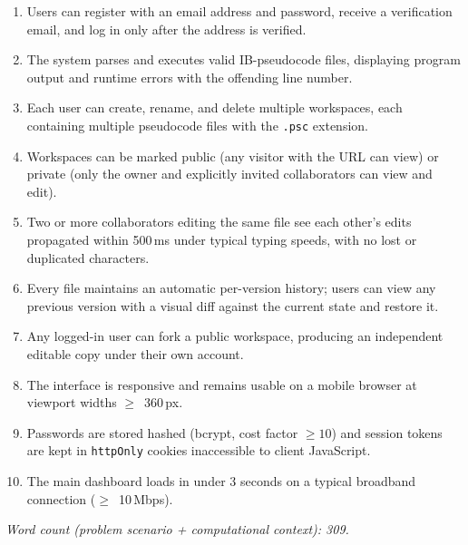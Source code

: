 \documentclass[11pt,a4paper]{article}
\begin{document}
\begin{enumerate}
  \item Users can register with an email address and password, receive a verification email, and log in only after the address is verified.
  \item The system parses and executes valid IB-pseudocode files, displaying program output and runtime errors with the offending line number.
  \item Each user can create, rename, and delete multiple workspaces, each containing multiple pseudocode files with the \texttt{.psc} extension.
  \item Workspaces can be marked public (any visitor with the URL can view) or private (only the owner and explicitly invited collaborators can view and edit).
  \item Two or more collaborators editing the same file see each other's edits propagated within 500\,ms under typical typing speeds, with no lost or duplicated characters.
  \item Every file maintains an automatic per-version history; users can view any previous version with a visual diff against the current state and restore it.
  \item Any logged-in user can fork a public workspace, producing an independent editable copy under their own account.
  \item The interface is responsive and remains usable on a mobile browser at viewport widths $\geq$~360\,px.
  \item Passwords are stored hashed (bcrypt, cost factor $\geq 10$) and session tokens are kept in \texttt{httpOnly} cookies inaccessible to client JavaScript.
  \item The main dashboard loads in under 3 seconds on a typical broadband connection ($\geq$~10\,Mbps).
\end{enumerate}

\vspace{0.4em}
\noindent\textit{Word count (problem scenario + computational context): 309.}
\end{document}
